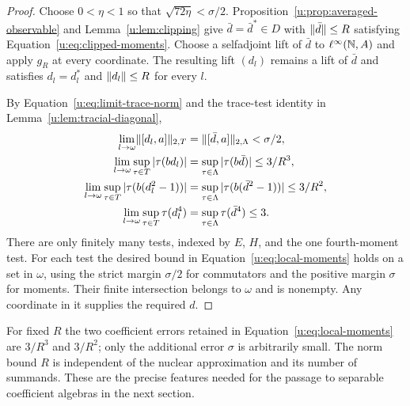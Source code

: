 \begin{proof}
Choose $0<\eta<1$ so that $\sqrt{72\eta}<\sigma/2$.
Proposition~\ref{u:prop:averaged-observable} and Lemma~\ref{u:lem:clipping}
give $\bar d=\bar d^*\in D$ with $\lVert\bar d\rVert\le R$ satisfying
Equation~\eqref{u:eq:clipped-moments}.  Choose a selfadjoint lift of
$\bar d$ to $\ell^\infty(\mathbb N,A)$ and apply $g_R$ at every coordinate.
The resulting lift $(d_l)$ remains a lift of $\bar d$ and satisfies
$d_l=d_l^*$ and $\lVert d_l\rVert\le R$ for every $l$.

By Equation~\eqref{u:eq:limit-trace-norm} and the trace-test identity in
Lemma~\ref{u:lem:tracial-diagonal},
\begin{align*}
 \lim_{l\to\omega}\lVert[d_l,a]\rVert_{2,T}
 &=\lVert[\bar d,a]\rVert_{2,\Lambda}<\sigma/2,\\
 \lim_{l\to\omega}\sup_{\tau\in T}|\tau(bd_l)|
 &=\sup_{\tau\in\Lambda}|\tau(b\bar d)|\le3/R^3,\\
 \lim_{l\to\omega}\sup_{\tau\in T}|\tau(b(d_l^2-1))|
 &=\sup_{\tau\in\Lambda}|\tau(b(\bar d^2-1))|\le3/R^2,\\
 \lim_{l\to\omega}\sup_{\tau\in T}\tau(d_l^4)
 &=\sup_{\tau\in\Lambda}\tau(\bar d^4)\le3.
\end{align*}
There are only finitely many tests, indexed by $E$, $H$, and the one
fourth-moment test.  For each test the desired bound in
Equation~\eqref{u:eq:local-moments} holds on a set in $\omega$, using the
strict margin $\sigma/2$ for commutators and the positive margin
$\sigma$ for moments.  Their finite intersection belongs to $\omega$
and is nonempty.  Any coordinate in it supplies the required $d$.
\end{proof}

For fixed $R$ the two coefficient errors retained in
Equation~\eqref{u:eq:local-moments} are $3/R^3$ and $3/R^2$; only the
additional error $\sigma$ is arbitrarily small.  The norm bound $R$ is
independent of the nuclear approximation and its number of summands.
These are the precise features needed for the passage to separable
coefficient algebras in the next section.
